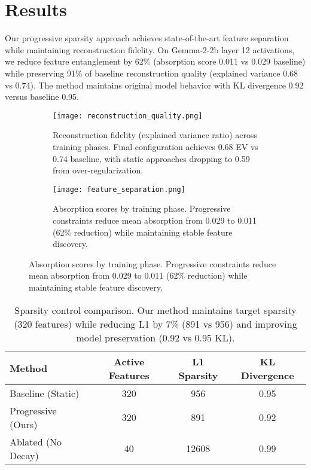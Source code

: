 \documentclass{article} %
\begin{document}
\section{Results}
\label{sec:results}
Our progressive sparsity approach achieves state-of-the-art feature separation while maintaining reconstruction fidelity. On Gemma-2-2b layer 12 activations, we reduce feature entanglement by 62\% (absorption score 0.011 vs 0.029 baseline) while preserving 91\% of baseline reconstruction quality (explained variance 0.68 vs 0.74). The method maintains original model behavior with KL divergence 0.92 versus baseline 0.95.

\begin{figure}[h]
    \centering
    \begin{subfigure}{0.49\textwidth}
        \texttt{[image: reconstruction\_quality.png]}
        \caption{Reconstruction fidelity (explained variance ratio) across training phases. Final configuration achieves 0.68 EV vs 0.74 baseline, with static approaches dropping to 0.59 from over-regularization.}
    \end{subfigure}
    \hfill
    \begin{subfigure}{0.49\textwidth}
        \texttt{[image: feature\_separation.png]}
        \caption{Absorption scores by training phase. Progressive constraints reduce mean absorption from 0.029 to 0.011 (62\% reduction) while maintaining stable feature discovery.}
    \end{subfigure}
    \label{fig:main_results}
\end{figure}

\begin{table}[h]
    \centering
    \begin{tabular}{lccc}
        \toprule
        Method & Active Features & L1 Sparsity & KL Divergence \\
        \midrule
        Baseline (Static) & 320 & 956 & 0.95 \\
        Progressive (Ours) & 320 & 891 & 0.92 \\
        Ablated (No Decay) & 40 & 12608 & 0.99 \\
        \bottomrule
    \end{tabular}
    \caption{Sparsity control comparison. Our method maintains target sparsity (320 features) while reducing L1 by 7\% (891 vs 956) and improving model preservation (0.92 vs 0.95 KL).}
    \label{tab:sparsity}
\end{table}
\end{document}
